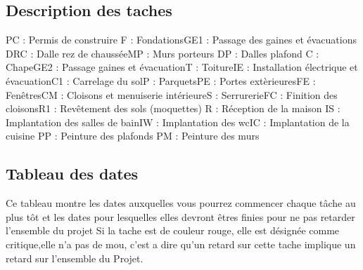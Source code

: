 \documentclass{article}
\begin{document}
\subsection{Description des taches}PC : Permis de construire \newline{}F : Fondations\newline{}GE1 : Passage des gaines et évacuations \newline{}DRC : Dalle rez de chaussée\newline{}MP : Murs porteurs \newline{}DP : Dalles plafond \newline{}C : Chape\newline{}GE2 : Passage gaines et évacuation\newline{}T : Toiture\newline{}IE : Installation électrique et évacuation\newline{}C1 : Carrelage du sol\newline{}P : Parquets\newline{}PE : Portes extèrieures\newline{}FE : Fenêtres\newline{}CM : Cloisons et menuiserie intérieure\newline{}S : Serrurerie\newline{}FC : Finition des cloisons\newline{}R1 : Revêtement des sols (moquettes) \newline{}R : Réception de la maison \newline{}IS : Implantation des salles de bain\newline{}IW : Implantation des wc\newline{}IC : Implantation de la cuisine \newline{}PP : Peinture des plafonds \newline{}PM : Peinture des murs\newline{}
\subsection{Tableau des dates}

Ce tableau montre les dates auxquelles vous pourrez commencer chaque tâche au plus tôt et les dates pour lesquelles elles devront êtres finies pour ne pas retarder l'ensemble du projet
Si la tache est de couleur rouge, elle est désignée comme critique,elle n'a pas de mou, c'est a dire qu'un retard sur cette tache implique un retard sur l'ensemble du Projet.\\
\end{document}
